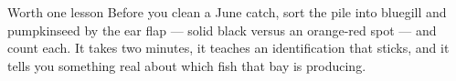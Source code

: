 \begin{telospanel}{Worth one lesson}
Before you clean a June catch, sort the pile into bluegill and pumpkinseed by the ear flap --- solid black versus an orange-red spot --- and count each. It takes two minutes, it teaches an identification that sticks, and it tells you something real about which fish that bay is producing. 
\end{telospanel}



\advisorypanfish


